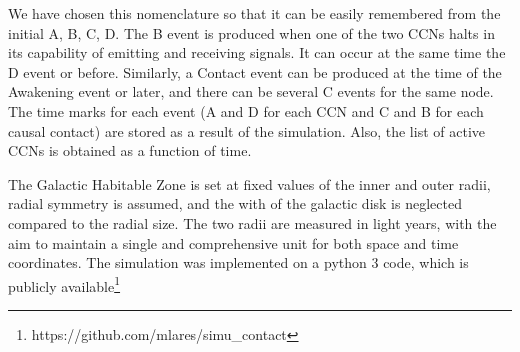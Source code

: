 \documentclass[crop]{CSLB}
\newcommand{\ceti}{CCN}
\newcommand{\cetis}{CCNs}
\newcommand{\blackout}{B event }
\newcommand{\doomsday}{D event }
\newcommand{\aawakening}{Awakening event }
\newcommand{\ccontact}{Contact event }
\newcommand{\contacts}{C events }
\begin{document}
We have chosen this nomenclature so that it can be easily remembered
from the initial A, B, C, D.
%
The \blackout is produced when one of the two \cetis{} halts in its
capability of emitting and receiving signals.
%
It can occur at the same time the \doomsday or before.
%
Similarly, a \ccontact can be produced at the time of the \aawakening
or later, and there can be several \contacts for the same node.
%
The time marks for each event (A and D for each \ceti{} and C and B
for each causal contact) are stored as a result of the simulation.
%
Also, the list of active \cetis{} is obtained as a function of time.
%



The Galactic Habitable Zone is set at fixed values of the inner and outer
radii, radial symmetry is assumed, and the with of the galactic disk
is neglected compared to the radial size.
%
The two radii are measured in light years, with the aim to maintain a
single and comprehensive unit for both space and time coordinates. 
%
The simulation was implemented on a python 3 code, which is publicly
available\footnote{https://github.com/mlares/simu\_contact}

\end{document}
